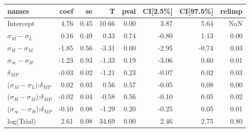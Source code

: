 

\begin{tabular}{lrrrrrrr}
\toprule
                                         names &  coef &   se &     T &  pval &  CI[2.5\%] &  CI[97.5\%] &  relimp \\
\midrule
                                     Intercept &  4.76 & 0.45 & 10.66 &  0.00 &       3.87 &        5.64 &     NaN \\
                     $\sigma_{M} - \sigma_{L}$ &  0.16 & 0.49 &  0.33 &  0.74 &      -0.80 &        1.13 &    0.00 \\
                     $\sigma_{H} - \sigma_{M}$ & -1.85 & 0.56 & -3.31 &  0.00 &      -2.95 &       -0.74 &    0.03 \\
                $\sigma_{\infty} - \sigma_{H}$ & -1.23 & 0.93 & -1.33 &  0.19 &      -3.06 &        0.60 &    0.01 \\
                                 $\delta_{MP}$ & -0.03 & 0.02 & -1.21 &  0.23 &      -0.07 &        0.02 &    0.03 \\
     ($\sigma_{M} - \sigma_{L}$):$\delta_{MP}$ &  0.02 & 0.03 &  0.56 &  0.57 &      -0.05 &        0.08 &    0.00 \\
     ($\sigma_{H} - \sigma_{M}$):$\delta_{MP}$ & -0.02 & 0.04 & -0.58 &  0.56 &      -0.10 &        0.05 &    0.02 \\
($\sigma_{\infty} - \sigma_{H}$):$\delta_{MP}$ & -0.10 & 0.08 & -1.29 &  0.20 &      -0.25 &        0.05 &    0.01 \\
                                    log(Trial) &  2.61 & 0.08 & 34.69 &  0.00 &       2.46 &        2.75 &    0.80 \\
\bottomrule
\end{tabular}


